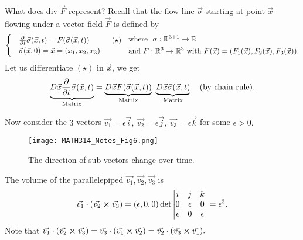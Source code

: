 \documentclass[
	12pt,
	]{article}
\newcommand{\R}{\mathbb{R}}
\theoremstyle{custom}
\theoremstyle{custom}
\theoremstyle{custom}
\theoremstyle{custom}
\theoremstyle{custom}
\theoremstyle{definition}
\theoremstyle{example}
\theoremstyle{note}
\theoremstyle{remark}
\theoremstyle{example}
\numberwithin{equation}{subsection}
\begin{document}
  				\noindent What does div $\vec{F}$ represent? Recall that the flow line $\vec{\sigma}$ starting at point $\vec{x}$ flowing under a vector field $\vec{F}$ is defined by 
  				\begin{equation*}
  					\begin{cases}
  						&\pdv{}{t} \vec{\sigma}(\vec{x},t) = F (\vec{\sigma}(\vec{x},t)) \qquad\quad (\star) \\
  						&\vec{\sigma}(\vec{x},0) =\vec{x}= (x_{1},x_{2},x_{3})
  					\end{cases} \ \ 
  					\begin{align*}
  						&\text{where } \ \sigma : \R^{3+1} \to \R \\
  						&\text{and} \ F:\R^{3} \to \R^{3} \ \text{with } F(\vec{x}) = (F_{1}(\vec{x}) , F_{2}(\vec{x}), F_{3} (\vec{x})).
  					\end{align*}
  				\end{equation*}
  				\noindent Let us differentiate $(\star)$ in $\vec{x}$, we get 
  				$$ \underbrace{D\vec{x} \pdv{}{t}\vec{\sigma}(\vec{x},t)}_{\text{Matrix}} = \underbrace{D\vec{x}F(\vec{\sigma}(\vec{x},t))}_{\text{Matrix}} \ \underbrace{D\vec{x}\vec{\sigma}(\vec{x},t)}_{\text{Matrix}} \quad \text{(by chain rule)}.$$
  				
  				\noindent Now consider the $3$ vectors $\vec{v_{1}} = \epsilon \vec{i} , \ \vec{v_{2}} = \epsilon \vec{j} , \ \vec{v_{3}}=\epsilon \vec{k}$ for some $\epsilon > 0.$
  				\begin{figure}[H]
  					\centering
  					\texttt{[image: MATH314\_Notes\_Fig6.png]}
  					\captionsetup{margin=1cm, justification=raggedright}\caption{The direction of sub-vectors change over time.}
  				\end{figure}
  				
  				\noindent The volume of the parallelepiped $\vec{v_{1}}, \vec{v_{2}}, \vec{v_{3}}$ is 
  				$$ \vec{v_{1}}\cdot (\vec{v_{2}} \cross \vec{v_{3}}) = (\epsilon, 0,0) \det 
  				\begin{vmatrix}
  					i & j& k \\
  					0 & \epsilon & 0 \\
  					\epsilon & 0 & \epsilon
  				\end{vmatrix} = \epsilon^{3}.$$
  				Note that $\vec{v_{1}}\cdot (\vec{v_{2}} \cross \vec{v_{3}}) = \vec{v_{3}} \cdot (\vec{v_{1}}\cross \vec{v_{2}})= \vec{v_{2}}\cdot (\vec{v_{3}}\cross \vec{v_{1}}).$
  				
\end{document}
